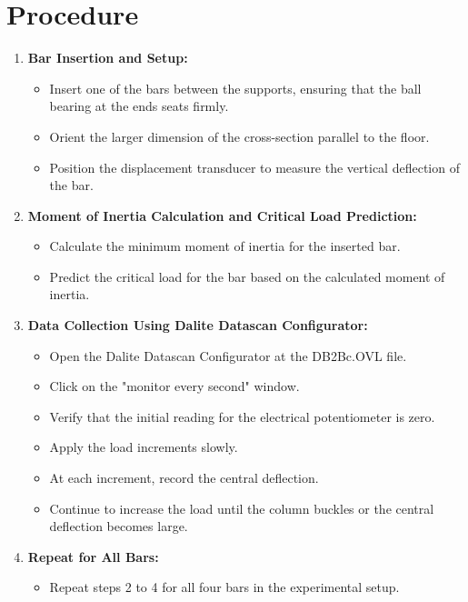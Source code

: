 \documentclass[12pt, titlepage]{article}
\begin{document}
\section{Procedure}
\begin{enumerate}
    \item \textbf{Bar Insertion and Setup:}
    \begin{itemize}
        \item Insert one of the bars between the supports, ensuring that the ball bearing at the ends seats firmly.
        \item Orient the larger dimension of the cross-section parallel to the floor.
        \item Position the displacement transducer to measure the vertical deflection of the bar.
    \end{itemize}

    \item \textbf{Moment of Inertia Calculation and Critical Load Prediction:}
    \begin{itemize}
        \item Calculate the minimum moment of inertia for the inserted bar.
        \item Predict the critical load for the bar based on the calculated moment of inertia.
    \end{itemize}

    \item \textbf{Data Collection Using Dalite Datascan Configurator:}
    \begin{itemize}
        \item Open the Dalite Datascan Configurator at the DB2Bc.OVL file.
        \item Click on the "monitor every second" window.
        \item Verify that the initial reading for the electrical potentiometer is zero.
        \item Apply the load increments slowly.
        \item At each increment, record the central deflection.
        \item Continue to increase the load until the column buckles or the central deflection becomes large.
    \end{itemize}

    \item \textbf{Repeat for All Bars:}
    \begin{itemize}
        \item Repeat steps 2 to 4 for all four bars in the experimental setup.
    \end{itemize}
\end{enumerate}
\end{document}
